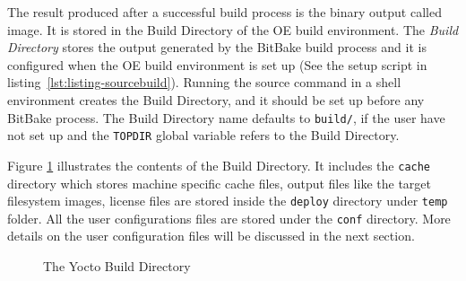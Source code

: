 The result produced after a successful build process is the binary output called image. It is stored in the Build Directory of the \ac{OE} build environment. The \emph{Build Directory} stores the output generated by the BitBake build process and it is configured when the \ac{OE} build environment is set up (See the setup script in listing~\ref{lst:listing-sourcebuild}). Running the source command in a shell environment creates the Build Directory, and it should be set up before any BitBake process. The Build Directory name defaults to \texttt{build/}, if the user have not set up and the \texttt{TOPDIR} global variable refers to the Build Directory.

\vspace{0.5cm}
\lstset{style=mystyle}

\vspace{0.5cm}

Figure \ref{fig:yoctobuilddir} illustrates the contents of the Build Directory. It includes the \texttt{cache} directory which stores machine specific cache files, output files like the target filesystem images, license files are stored inside the \texttt{deploy} directory under \texttt{temp} folder. All the user configurations files are stored under the \texttt{conf} directory. More details on the user configuration files will be discussed in the next section.

\vspace{0.5cm}
\begin{figure}[H]
%
\caption{The Yocto Build Directory}
\label{fig:yoctobuilddir}
\end{figure}
\vspace{0.5cm}

